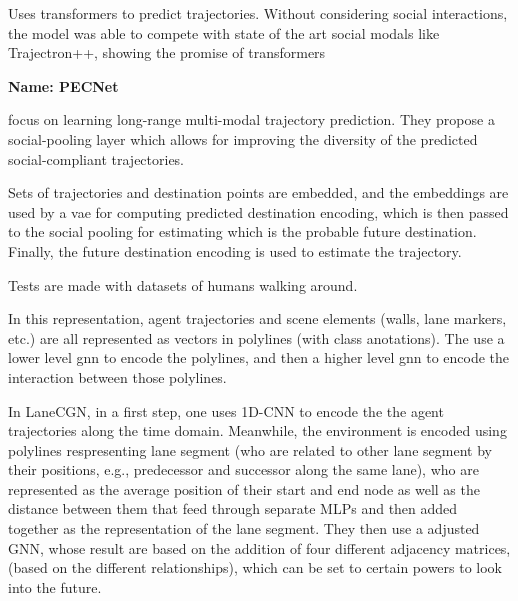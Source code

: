 \cite{giuliari2020transformer} Uses transformers to predict trajectories. Without considering social interactions, the model was able to compete with state of the art social modals like Trajectron++, showing the promise of transformers



\textbf{Name: PECNet}

\cite{mangalam2020not} focus on learning long-range multi-modal trajectory prediction. They propose a social-pooling layer which allows for improving the diversity of the predicted social-compliant trajectories.

Sets of trajectories and destination points are embedded, and the embeddings are used by a \gls{vae} for computing predicted destination encoding, which is then passed to the social pooling for estimating which is the probable future destination.
%
Finally, the future destination encoding is used to estimate the trajectory.
%

Tests are made with datasets of humans walking around.



\cite{gao2020vectornet} In this representation, agent trajectories and scene elements (walls, lane markers, etc.) are all represented as vectors in polylines (with class anotations). The use a lower level gnn to encode the polylines, and then a higher level gnn to encode the interaction between those polylines. 

 
\cite{liang2020learning} In LaneCGN, in a first step, one uses 1D-CNN to encode the the agent trajectories along the time domain. Meanwhile, the environment is encoded using polylines respresenting lane segment (who are related to other lane segment by their positions, e.g., predecessor and successor along the same lane), who are represented as the average position of their start and end node as well as the distance between them that feed through separate MLPs and then added together as the representation of the lane segment. They then use a adjusted GNN, whose result are based on the addition of four different adjacency matrices, (based on the different relationships), which can be set to certain powers to look into the future.

